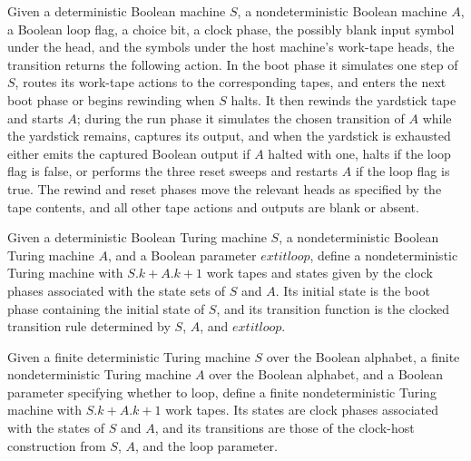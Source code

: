 \begin{definition}
\label{Turing.ClockHost.clockTr}
\leanok
{}
Given a deterministic Boolean machine $S$, a nondeterministic Boolean machine $A$, a
Boolean loop flag, a choice bit, a clock phase, the possibly blank input symbol under
the head, and the symbols under the host machine's work-tape heads, the transition
returns the following action. In the boot phase it simulates one step of $S$, routes its
work-tape actions to the corresponding tapes, and enters the next boot phase or begins
rewinding when $S$ halts. It then rewinds the yardstick tape and starts $A$; during the
run phase it simulates the chosen transition of $A$ while the yardstick remains,
captures its output, and when the yardstick is exhausted either emits the captured
Boolean output if $A$ halted with one, halts if the loop flag is false, or performs the
three reset sweeps and restarts $A$ if the loop flag is true. The rewind and reset
phases move the relevant heads as specified by the tape contents, and all other tape
actions and outputs are blank or absent.
\end{definition}

\begin{definition}
\label{Turing.ClockHost.hostTM}
\leanok
{}
Given a deterministic Boolean Turing machine $S$, a nondeterministic Boolean Turing
machine $A$, and a Boolean parameter $	extit{loop}$, define a nondeterministic Turing
machine with $S.k + A.k + 1$ work tapes and states given by the clock phases associated
with the state sets of $S$ and $A$. Its initial state is the boot phase containing the
initial state of $S$, and its transition function is the clocked transition rule
determined by $S$, $A$, and $	extit{loop}$.
\end{definition}

\begin{definition}
\label{Turing.FinNDTM.clockHost}
\leanok
{}
Given a finite deterministic Turing machine $S$ over the Boolean alphabet, a finite
nondeterministic Turing machine $A$ over the Boolean alphabet, and a Boolean parameter
specifying whether to loop, define a finite nondeterministic Turing machine with
$S.k+A.k+1$ work tapes. Its states are clock phases associated with the states of $S$
and $A$, and its transitions are those of the clock-host construction from $S$, $A$, and
the loop parameter.
\end{definition}

